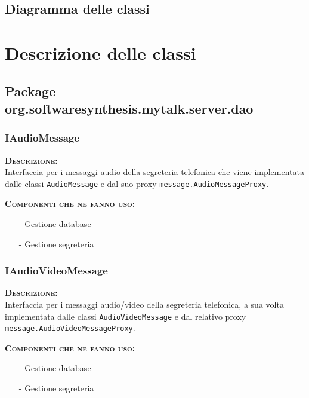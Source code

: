\subsection{Diagramma delle classi}
\clearpage

\section{Descrizione delle classi}

\subsection{Package org.softwaresynthesis.mytalk.server.dao}

\subsubsection{IAudioMessage}
\begin{description}
	\item{\scshape\bfseries Descrizione:}\\
Interfaccia per i messaggi audio della segreteria telefonica che viene implementata dalle classi \texttt{AudioMessage} e dal suo proxy \texttt{message.AudioMessageProxy}.
	\item{\scshape\bfseries Componenti che ne fanno uso:}
	  \begin{itemize}[noitemsep,nolistsep]
	  \item[-] Gestione database
	  \item[-] Gestione segreteria
	  \end{itemize}
\end{description}

\subsubsection{IAudioVideoMessage}
\begin{description}
	\item{\scshape\bfseries Descrizione:}\\
Interfaccia per i messaggi audio/video della segreteria telefonica, a sua volta implementata dalle classi \texttt{AudioVideoMessage} e dal relativo proxy \texttt{message.AudioVideoMessageProxy}.
	\item{\scshape\bfseries Componenti che ne fanno uso:} 
	  \begin{itemize}[noitemsep,nolistsep]
	    \item[-] Gestione database
	    \item[-] Gestione segreteria
	  \end{itemize}
\end{description}

